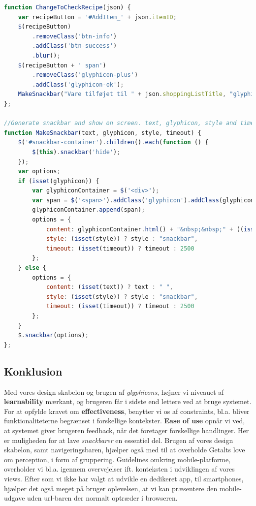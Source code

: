 \begin{lstlisting}[language=JavaScript,caption={Javascript funktioner, der giver bruger feedback},label=code:user_feedback]
function ChangeToCheckRecipe(json) {
    var recipeButton = '#AddItem_' + json.itemID;
    $(recipeButton)
        .removeClass('btn-info')
        .addClass('btn-success')
        .blur();
    $(recipeButton + ' span')
        .removeClass('glyphicon-plus')
        .addClass('glyphicon-ok');
    MakeSnackbar("Vare tilføjet til " + json.shoppingListTitle, "glyphicon-ok", "toast", "1500");
};

//Generate snackbar and show on screen. text, glyphicon, style and timeout is optional.
function MakeSnackbar(text, glyphicon, style, timeout) {
    $('#snackbar-container').children().each(function () {
        $(this).snackbar('hide');
    });
    var options;
    if (isset(glyphicon)) {
        var glyphiconContainer = $('<div>');
        var span = $('<span>').addClass('glyphicon').addClass(glyphicon);
        glyphiconContainer.append(span);
        options = {
            content: glyphiconContainer.html() + "&nbsp;&nbsp;" + ((isset(text)) ? text : " "),
            style: (isset(style)) ? style : "snackbar",
            timeout: (isset(timeout)) ? timeout : 2500
        };
    } else {
        options = {
            content: (isset(text)) ? text : " ",
            style: (isset(style)) ? style : "snackbar",
            timeout: (isset(timeout)) ? timeout : 2500
        };
    }
    $.snackbar(options);
};
\end{lstlisting}

\subsection{Konklusion}
Med vores design skabelon og brugen af \textit{glyphicons}, højner vi niveauet af \textbf{learnability} mærkant, og brugeren får i sidste end lettere ved at bruge systemet.
For at opfylde kravet om \textbf{effectiveness}, benytter vi os af constraints, bl.a. bliver funktionaliteterne begrænset i forskellige kontekster.
\textbf{Ease of use} opnår vi ved, at systemet giver brugeren feedback, når det foretager forskellige handlinger.
Her er muligheden for at lave \textit{snackbarer} en essentiel del.
Brugen af vores design skabelon, samt navigeringsbaren, hjælper også med til at overholde Getalts love om perception, i form af gruppering.
Guidelines omkring mobile-platforme, overholder vi bl.a. igennem overvejelser ift. konteksten i udviklingen af vores views.
Efter som vi ikke har valgt at udvikle en dedikeret app, til smartphones, hjælper det også meget på bruger oplevelsen, at vi kan præsentere den mobile-udgave uden url-baren der normalt optræder i browseren.